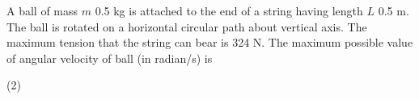 
\item A ball of mass \( m \) 0.5 kg is attached to the end of a string having length \( L \) 0.5 m. The ball is rotated on a horizontal circular path about vertical axis. The maximum tension that the string can bear is 324 N. The maximum possible value of angular velocity of ball (in radian/s) is
    \begin{center}
    \end{center}
    \begin{tasks}(2)
    \end{tasks}
